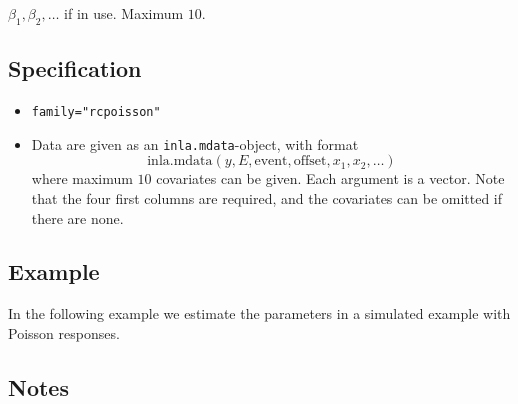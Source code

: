 \documentclass[a4paper,11pt]{article}
\begin{document}
$\beta_1, \beta_2, \ldots$ if in use. Maximum $10$. 

\subsection*{Specification}

\begin{itemize}
\item \texttt{family="rcpoisson"}
\item Data are given as an \texttt{inla.mdata}-object, with format
    \begin{displaymath}
        \text{inla.mdata}(y, E, \text{event}, \text{offset}, x_1,
        x_2, \ldots)
    \end{displaymath}
    where maximum $10$ covariates can be given. Each argument is a
    vector. Note that the four first columns are required, and the
    covariates can be omitted if there are none.
\end{itemize}


\subsection*{Example}

In the following example we estimate the parameters in a simulated
example with Poisson responses.


\subsection*{Notes}
\end{document}
